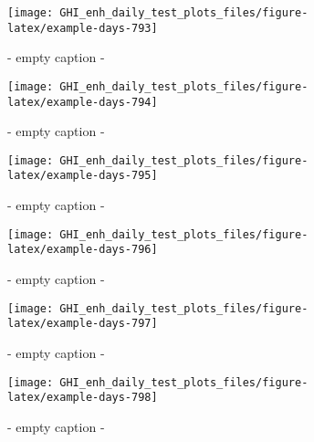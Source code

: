 \documentclass[
  10pt,
  a4paper,oneside]{article}
\begin{document}
\begin{figure}[H]

{\centering \texttt{[image: GHI\_enh\_daily\_test\_plots\_files/figure-latex/example-days-793]} 

}

\caption{ - empty caption - }\label{fig:example-days-793}
\end{figure}

\begin{figure}[H]

{\centering \texttt{[image: GHI\_enh\_daily\_test\_plots\_files/figure-latex/example-days-794]} 

}

\caption{ - empty caption - }\label{fig:example-days-794}
\end{figure}

\begin{figure}[H]

{\centering \texttt{[image: GHI\_enh\_daily\_test\_plots\_files/figure-latex/example-days-795]} 

}

\caption{ - empty caption - }\label{fig:example-days-795}
\end{figure}

\begin{figure}[H]

{\centering \texttt{[image: GHI\_enh\_daily\_test\_plots\_files/figure-latex/example-days-796]} 

}

\caption{ - empty caption - }\label{fig:example-days-796}
\end{figure}

\begin{figure}[H]

{\centering \texttt{[image: GHI\_enh\_daily\_test\_plots\_files/figure-latex/example-days-797]} 

}

\caption{ - empty caption - }\label{fig:example-days-797}
\end{figure}

\begin{figure}[H]

{\centering \texttt{[image: GHI\_enh\_daily\_test\_plots\_files/figure-latex/example-days-798]} 

}

\caption{ - empty caption - }\label{fig:example-days-798}
\end{figure}
\end{document}

